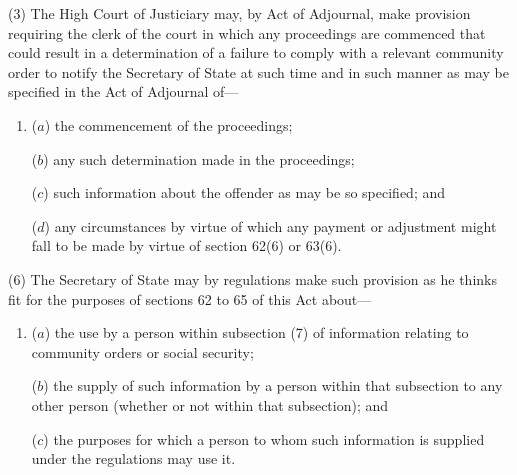 \documentclass[12pt,a4paper]{article}
\begin{document}
(3) The High Court of Justiciary may, by Act of Adjournal, make provision requiring the clerk of the court in which any proceedings are commenced that could result in a determination of a failure to comply with a relevant community order to notify the Secretary of State at such time and in such manner as may be specified in the Act of Adjournal of—
\begin{enumerate}\item[]
($a$) the commencement of the proceedings;

($b$) any such determination made in the proceedings;

($c$) such information about the offender as may be so specified; and

($d$) any circumstances by virtue of which any payment or adjustment might fall to be made by virtue of section 62(6)  or 63(6).
\end{enumerate}

%


(6) The Secretary of State may by regulations make such provision as he thinks fit for the purposes of sections 62 to 65 of this Act about—
\begin{enumerate}\item[]
($a$) the use by a person within subsection (7)  of information relating to community orders or social security;

($b$) the supply of such information by a person within that subsection to any other person (whether or not within that subsection); and

($c$) the purposes for which a person to whom such information is supplied under the regulations may use it.
\end{enumerate}
\end{document}
